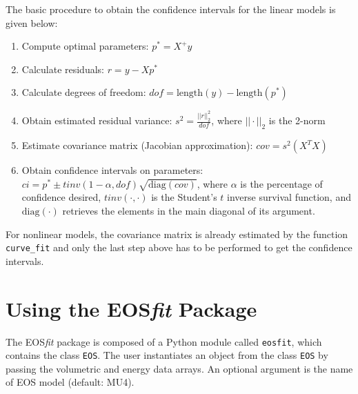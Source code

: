\documentclass[letter, 12pt]{article}
\begin{document}
The basic procedure to obtain the confidence intervals for the linear models is given below:
\begin{enumerate}
	\item Compute optimal parameters: $p^* = X^+y$
	
	\item Calculate residuals: $r = y - Xp^*$
	
	\item Calculate degrees of freedom: $dof = \text{length}(y) - \text{length}(p^*)$
	
	\item Obtain estimated residual variance: $s^2 = \frac{||r||_2^2}{dof}$, where $||\cdot||_2$ is the 2-norm
	
	\item Estimate covariance matrix (Jacobian approximation): $cov = s^2(X^TX)$
	
	\item Obtain confidence intervals on parameters: $ci = p^* \pm tinv(1 - \alpha, dof)\sqrt{\text{diag}(cov)}$, where $\alpha$ is the percentage of confidence desired, $tinv(\cdot, \cdot)$ is the Student's $t$ inverse survival function, and $\text{diag}(\cdot)$ retrieves the elements in the main diagonal of its argument.
\end{enumerate}

For nonlinear models, the covariance matrix is already estimated by the function \texttt{curve\_fit} and only the last step above has to be performed to get the confidence intervals.


\section{Using the EOS\textsl{fit} Package}

The EOS\textsl{fit} package is composed of a Python module called \texttt{eosfit}, which contains the class \texttt{EOS}. The user instantiates an object from the class \texttt{EOS} by passing the volumetric and energy data arrays. An optional argument is the name of EOS model (default: MU4).
\end{document}
